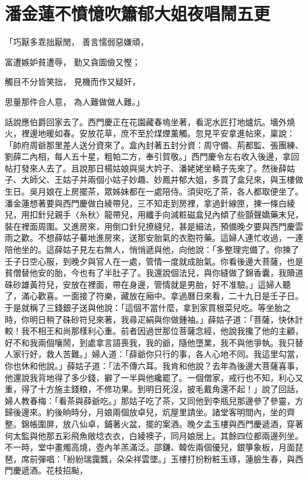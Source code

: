 %

\chapter{潘金蓮不憤憶吹簫\KG 郁大姐夜唱鬧五更}


「巧厭多乖拙厭閒，  善言懦弱惡嫌頑，

富遭嫉妒貧遭辱，  勤又貪圖儉又慳；

觸目不分皆笑拙，  見機而作又疑奸，

思量那件合人意，  為人難做做人難。」

話說應伯爵回家去了。西門慶正在花園藏春塢坐著，看泥水匠打地爐炕。墻外燒火，裡邊地暖如春。安放花草，庶不至於煤煙薰觸。忽見平安拿進帖來，稟說：「帥府周爺那里差人送分資來了。盒內封著五封分資：周守備、荊都監、張團練、劉薛二內相，每人五十星，粗帕二方，奉引賀敬。」西門慶令左右收入後邊，拿回帖打發來人去了。且說那日楊姑娘與吳大妗子、潘姥姥坐轎子先來了。然後薛姑子、大師父、王姑子并兩個小姑子妙趣、妙鳳并郁大姐，多買了盒兒來，與玉樓做生日。吳月娘在上房擺茶，眾姊妹都在一處陪侍。須臾吃了茶，各人都取便坐了。潘金蓮想著要與西門慶做白綾帶兒，三不知走到房裡，拿過針線匣，揀一條白綾兒，用扣針兒親手〈糸秋〉龍帶兒，用纖手向減粧磁盒兒內傾了些顫聲嬌藥末兒，裝在裡面周圍。又進房來，用倒口針兒撩縫兒，甚是細法，預備晚夕要與西門慶雲雨之歡。不想薛姑子驀地進房來，送那安胎氣的衣胞符藥。這婦人連忙收過，一連陪他坐的。這薛姑子見左右無人，悄悄遞與他，向他說：「多整理完備了。你揀了壬子日空心服，到晚夕與官人在一處，管情一度就成胎氣。你看後邊大菩薩，也是貧僧替他安的胎，今也有了半肚子了。我還說個法兒，與你縫做了錦香囊，我贖道硃砂雄黃符兒，安放在裡面，帶在身邊，管情就是男胎，好不准驗。」這婦人聽了，滿心歡喜。一面接了符樂，藏放在廂中。拿過曆日來看，二十九日是壬子日。于是就稱了三錢銀子送與他說：「這個不當什麼，拿到家買根菜兒吃。等坐胎之時，你明日稍了硃砂符兒來著，我尋疋絹與你做鍾袖。」薛姑子道：「菩薩，快休計較！我不相王和尚那樣利心重。前者因過世那位菩薩念經，他說我攙了他的主顧，好不和我兩個嚷鬧，到處拿言語喪我，我的爺，隨他墮業，我不與他爭執。我只替人家行好，救人苦難。」婦人道：「薛爺你只行的事，各人心地不同。我這里勾當，你也休和他說。」薛姑子道：「法不傳六耳。我肯和他說？去年為後邊大菩薩喜事，他還說我背地得了多少錢，擗了一半與他纔罷了。一個僧家，戒行也不知，利心又重，得了十方施主錢粮，不修功果。到明日死沒，披毛戴角還不起！」說了回話，婦人教春梅：「看茶與薛爺吃。」那姑子吃了茶，又同他到李瓶兒那邊參了參靈，方歸後邊來。約後晌時分，月娘兩個放卓兒，炕屋里請坐。諸堂客明間內，坐的齊整。錦帳圍屏，放八仙卓，鋪著火盆，擺的案酒。晚夕孟玉樓與西門慶遞酒，穿著何太監與他那五彩飛魚敞埝衣衣，白綾襖子，同月娘居上。其餘四位都兩邊列坐。不一時，堂中畫燭高燒，壺內羊羔滿泛。邵鎌、韓佐兩個優兒，銀箏象板，月面琵琶，席前彈唱：「紛紛瑞靄飄，朵朵祥雲墜。」玉樓打扮粉粧玉琢，蓮臉生春，與西門慶遞酒。花枝招颭，